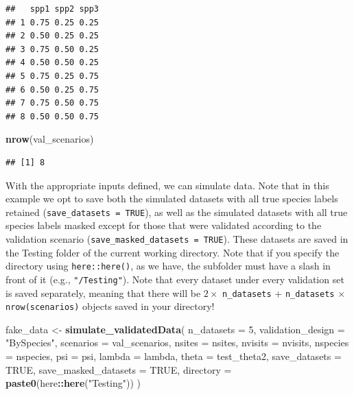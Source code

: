 \documentclass[
]{article}
\newenvironment{Shaded}{\begin{snugshade}}{\end{snugshade}}
\newcommand{\AttributeTok}[1]{\textcolor[rgb]{0.13,0.29,0.53}{#1}}
\newcommand{\ConstantTok}[1]{\textcolor[rgb]{0.56,0.35,0.01}{#1}}
\newcommand{\DecValTok}[1]{\textcolor[rgb]{0.00,0.00,0.81}{#1}}
\newcommand{\FunctionTok}[1]{\textcolor[rgb]{0.13,0.29,0.53}{\textbf{#1}}}
\newcommand{\NormalTok}[1]{#1}
\newcommand{\OtherTok}[1]{\textcolor[rgb]{0.56,0.35,0.01}{#1}}
\newcommand{\SpecialCharTok}[1]{\textcolor[rgb]{0.81,0.36,0.00}{\textbf{#1}}}
\newcommand{\StringTok}[1]{\textcolor[rgb]{0.31,0.60,0.02}{#1}}
\begin{document}
\begin{verbatim}
##   spp1 spp2 spp3
## 1 0.75 0.25 0.25
## 2 0.50 0.25 0.25
## 3 0.75 0.50 0.25
## 4 0.50 0.50 0.25
## 5 0.75 0.25 0.75
## 6 0.50 0.25 0.75
## 7 0.75 0.50 0.75
## 8 0.50 0.50 0.75
\end{verbatim}

\begin{Shaded}
\begin{Highlighting}[]
\FunctionTok{nrow}\NormalTok{(val\_scenarios)}
\end{Highlighting}
\end{Shaded}

\begin{verbatim}
## [1] 8
\end{verbatim}

\linespread{1}

With the appropriate inputs defined, we can simulate data. Note that in this example we opt to save both the simulated datasets with all true species labels retained (\texttt{save\_datasets\ =\ TRUE}), as well as the simulated datasets with all true species labels masked except for those that were validated according to the validation scenario (\texttt{save\_masked\_datasets\ =\ TRUE}). These datasets are saved in the Testing folder of the current working directory. Note that if you specify the directory using \texttt{here::here()}, as we have, the subfolder must have a slash in front of it (e.g., \texttt{"/Testing"}). Note that every dataset under every validation set is saved separately, meaning that there will be \(2 \times\) \texttt{n\_datasets} + \texttt{n\_datasets} \(\times\) \texttt{nrow(scenarios)} objects saved in your directory!

\linespread{1}

\begin{Shaded}
\begin{Highlighting}[]
\NormalTok{fake\_data }\OtherTok{\textless{}{-}} \FunctionTok{simulate\_validatedData}\NormalTok{(}
  \AttributeTok{n\_datasets =} \DecValTok{5}\NormalTok{, }
  \AttributeTok{validation\_design =} \StringTok{"BySpecies"}\NormalTok{,}
  \AttributeTok{scenarios =}\NormalTok{ val\_scenarios, }
  \AttributeTok{nsites =}\NormalTok{ nsites, }
  \AttributeTok{nvisits =}\NormalTok{ nvisits, }
  \AttributeTok{nspecies =}\NormalTok{ nspecies,}
  \AttributeTok{psi =}\NormalTok{ psi, }
  \AttributeTok{lambda =}\NormalTok{ lambda,}
  \AttributeTok{theta =}\NormalTok{ test\_theta2, }
  \AttributeTok{save\_datasets =} \ConstantTok{TRUE}\NormalTok{,}
  \AttributeTok{save\_masked\_datasets =} \ConstantTok{TRUE}\NormalTok{,}
  \AttributeTok{directory =} \FunctionTok{paste0}\NormalTok{(here}\SpecialCharTok{::}\FunctionTok{here}\NormalTok{(}\StringTok{"Testing"}\NormalTok{))}
\NormalTok{)}
\end{Highlighting}
\end{Shaded}
\end{document}
